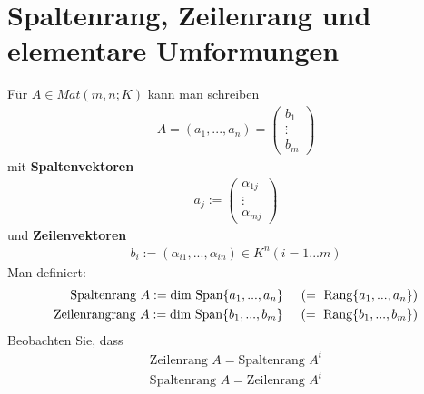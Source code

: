 \documentclass[11pt]{report}
\newcommand*\f[1] {\textbf{#1}}
\begin{document}
\section{Spaltenrang, Zeilenrang und elementare Umformungen}
Für $A \in Mat(m,n;K)$ kann man schreiben
\begin{align}
A = (a_1,...,a_n) = \begin{pmatrix} b_1 \\ \vdots \\ b_m\end{pmatrix}
\end{align}
mit \f{Spaltenvektoren}
\begin{align}
 a_j := \begin{pmatrix} \alpha_{1j} \\ \vdots \\ \alpha_{mj}\end{pmatrix}
\end{align}
und \f{Zeilenvektoren}
\begin{align}
 b_i := (\alpha_{i1}, ..., \alpha_{in}) \in K^n (i = 1...m)
\end{align}
Man definiert:
\begin{align}
 \text{Spaltenrang } A := \text{dim Span}\{a_1, ..., a_n\} \hspace*{0.5cm}(=\text{ Rang}\{a_1, ..., a_n\}) \\
 \text{Zeilenrangrang } A := \text{dim Span}\{b_1, ..., b_m\} \hspace*{0.5cm}(=\text{ Rang}\{b_1, ..., b_m\}) 
\end{align}
Beobachten Sie, dass
\begin{align}
 \text{Zeilenrang } A = \text{Spaltenrang } A^t \\
\text{Spaltenrang } A = \text{Zeilenrang } A^t  
\end{align}
\end{document}
